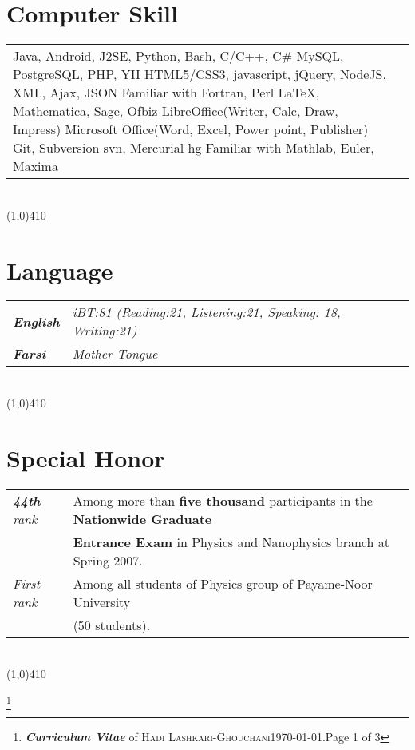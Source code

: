 \documentclass[10pt]{article}
\newcommand\HRule{\hspace*{.8cm}\line(1,0){410}\\}
\newenvironment{Record}[1]
{
    \vspace{-0.35cm}
    \section*{#1}
        \vspace{-0.1cm}
        \begin{tabular}
}
{
        \end{tabular}\\
        \HRule
}
\newcommand{\FootNote}[2]{\let\thefootnote\relax\footnote{\textbf{\textit{Curriculum Vitae}} of \textsc{Hadi Lashkari-Ghouchani}\qquad\today.\qquad Page #1 of #2}}
\begin{document}
\begin{Record}{Computer Skill}{l l}
    \ComputerSkill{Programming}
        {Java, Android, J2SE, Python, Bash, C/C++, C\#}
        {MySQL, PostgreSQL, PHP, YII}
        {HTML5/CSS3, javascript, jQuery, NodeJS, XML, Ajax, JSON}
        {Familiar with Fortran, Perl}{}%
    \ComputerSkill{OS}{Linux(Ubuntu, Debian, OpenSUSE), Windows}{}{}{}{}%
    \ComputerSkill{Special Software}
        {\LaTeX, Mathematica, Sage, Ofbiz}
        {LibreOffice(Writer, Calc, Draw, Impress)}
        {Microsoft Office(Word, Excel, Power point, Publisher)}
        {Git, Subversion svn, Mercurial hg}
        {Familiar with Mathlab, Euler, Maxima}%
\end{Record}


\newcommand{\Language}[2]{
    \textbf{\textsl{#1}}&\textit{#2}\\
}
\begin{Record}{Language}{l l}
    \Language{English}
        {iBT:81 (Reading:21, Listening:21, Speaking: 18, Writing:21)}%
    \Language{Farsi}{Mother Tongue}%
\end{Record}

\newcommand{\SpecialHonor}[3]{
    \textsl{ #1}&#2\\
    &#3\\
}
\begin{Record}{Special Honor}{l l}
    \SpecialHonor{\textbf{44th} rank}
        {Among more than \textbf{five thousand} participants in the \textbf{Nationwide Graduate}}
        {\textbf{Entrance Exam} in Physics and Nanophysics branch at Spring 2007.}%
    \SpecialHonor{First rank}
        {Among all students of Physics group of Payame-Noor University}
        {(50 students).}%
\end{Record}



\FootNote{1}{3}

\end{document}
